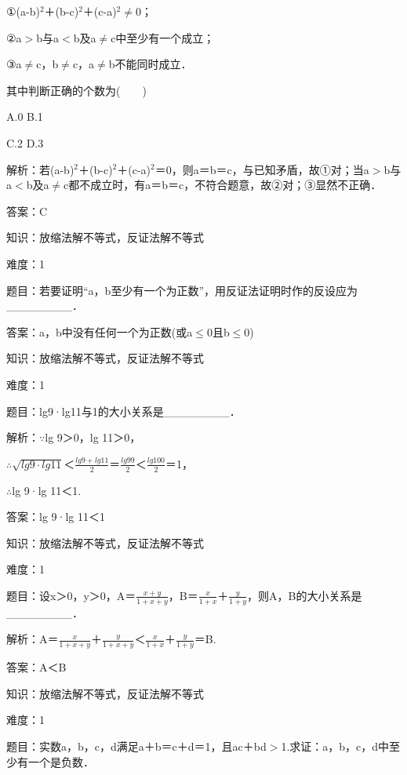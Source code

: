 \documentclass{article} %
\begin{document}
①(a-b)${}^{2}$＋(b-c)${}^{2}$＋(c-a)${}^{2}$$\mathrm{\neq}$0；

②a$\mathrm{>}$b与a$\mathrm{<}$b及a$\mathrm{\neq}$c中至少有一个成立；

③a$\mathrm{\neq}$c，b$\mathrm{\neq}$c，a$\mathrm{\neq}$b不能同时成立．

其中判断正确的个数为(　　)

A.0  B.1  

C.2  D.3

 解析：若(a-b)${}^{2}$＋(b-c)${}^{2}$＋(c-a)${}^{2}$＝0，则a＝b＝c，与已知矛盾，故①对；当a$\mathrm{>}$b与a$\mathrm{<}$b及a$\mathrm{\neq}$c都不成立时，有a＝b＝c，不符合题意，故②对；③显然不正确．

 答案：C

 

 知识：放缩法解不等式，反证法解不等式

 难度：1

 题目：若要证明``a，b至少有一个为正数''，用反证法证明时作的反设应为\_\_\_\_\_\_\_\_．

 答案：a，b中没有任何一个为正数(或a$\mathrm{\le}$0且b$\mathrm{\le}$0)

 

 知识：放缩法解不等式，反证法解不等式

 难度：1

 题目：lg9·lg11与1的大小关系是\_\_\_\_\_\_\_\_．

 解析：$\mathrm{\because}$lg 9＞0，lg 11＞0，

$\mathrm{\therefore}$$\sqrt{lg9\cdot lg11}$＜$\frac{lg9+lg11}{2}$＝$\frac{lg99}{2}$＜$\frac{lg100}{2}$＝1，

$\mathrm{\therefore}$lg 9·lg 11＜1.

 答案：lg 9·lg 11＜1

 

 知识：放缩法解不等式，反证法解不等式

 难度：1

 题目：设x＞0，y＞0，A＝$\frac{x+y}{1+x+y}$，B＝$\frac{x}{1+x}$＋$\frac{y}{1+y}$，则A，B的大小关系是\_\_\_\_\_\_\_\_．

 解析：A＝$\frac{x}{1+x+y}$＋$\frac{y}{1+x+y}$＜$\frac{x}{1+x}$＋$\frac{y}{1+y}$＝B.

 答案：A＜B

 

 知识：放缩法解不等式，反证法解不等式

 难度：1

 题目：实数a，b，c，d满足a＋b＝c＋d＝1，且ac＋bd$\mathrm{>}$1.求证：a，b，c，d中至少有一个是负数．
\end{document}
